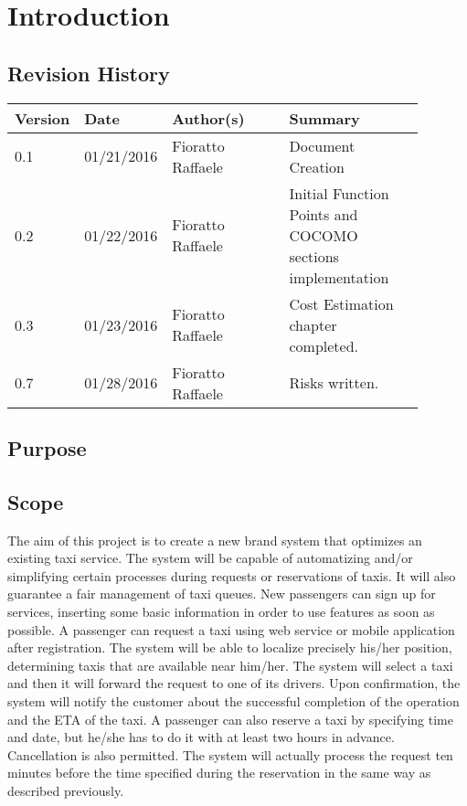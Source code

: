 \newpage
\section{Introduction}
\subsection{Revision History}
\begin{table}[H]
	\centering
	\begin{tabular*}{\linewidth}{|p{0.1\linewidth}|p{0.13\linewidth}|p{0.3099\linewidth}|p{0.3499\linewidth}|}
		\hline
		\textbf{Version} & \textbf{Date}       & \textbf{Author(s)}         & \textbf{Summary}           \\ \hline
		0.1     & 01/21/2016 & Fioratto Raffaele & Document Creation \\ \hline
		0.2     & 01/22/2016 & Fioratto Raffaele & Initial Function Points and COCOMO sections implementation \\ \hline
		0.3		& 01/23/2016 & Fioratto Raffaele &
		Cost Estimation chapter completed. \\ \hline
		0.7		& 01/28/2016 & Fioratto Raffaele &
		Risks written. \\ \hline
	\end{tabular*}
\end{table}
\break
\subsection{Purpose}
\subsection{Scope}
The aim of this project is to create a new brand system that optimizes an 
existing taxi service.
The system will be capable of automatizing and/or simplifying certain 
processes during requests or reservations of taxis.
It will also guarantee a fair management of taxi queues.
New passengers can sign up for services, inserting some basic information in order to use features as soon as possible.
A passenger can request a taxi using web service or mobile
application after registration. The system will be able to localize precisely his/her position, determining taxis that are available near
him/her. The system will select a taxi and then it will forward the request to one of its drivers.
Upon confirmation, the system will notify the customer about the successful completion of the operation and the ETA of the taxi. A passenger can also reserve a taxi by specifying time and date, but he/she has to do it with at least two hours in advance. Cancellation is also permitted. The system will actually process the request ten minutes before the time specified during the reservation in the same way as described previously.
